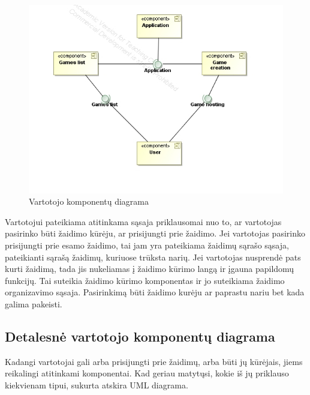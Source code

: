 \documentclass{VUMIFPSkursinis}
\begin{document}
		\begin{figure}[H]
			\centering
			\includegraphics[scale=0.6]{img/UMLComponent2}
			\caption{Vartotojo komponentų diagrama}
			\label{img:UMLComponent2}
		\end{figure}
		Vartotojui pateikiama atitinkama sąsaja priklausomai nuo to, ar vartotojas pasirinko būti žaidimo kūrėju, ar prisijungti prie žaidimo. Jei vartotojas pasirinko prisijungti prie esamo žaidimo, tai jam yra pateikiama žaidimų sąrašo sąsaja, pateikianti sąrašą žaidimų, kuriuose trūksta narių. Jei vartotojas nusprendė pats kurti žaidimą, tada jis nukeliamas į žaidimo kūrimo langą ir įgauna papildomų funkcijų. Tai suteikia žaidimo kūrimo komponentas ir jo suteikiama žaidimo organizavimo sąsaja. Pasirinkimą būti žaidimo kurėju ar paprastu nariu bet kada galima pakeisti. 
		
		\subsection{Detalesnė vartotojo komponentų diagrama}
		Kadangi vartotojai gali arba prisijungti prie žaidimų, arba būti jų kūrėjais, jiems reikalingi atitinkami komponentai. Kad geriau matytųsi, kokie iš jų priklauso kiekvienam tipui, sukurta atskira UML diagrama.
		
\end{document}
